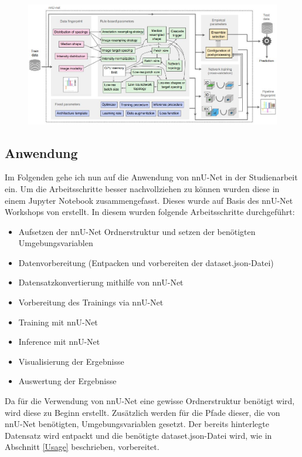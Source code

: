 \begin{figure}[H]
\includegraphics[width=\linewidth]{./images/nnUnetAutomatedMethodConfig.jpg}
\label{fig:nnUNetConfig}
\end{figure}


\subsection{Anwendung}
Im Folgenden gehe ich nun auf die Anwendung von nnU-Net in der Studienarbeit ein. Um die Arbeitsschritte besser nachvollziehen zu können wurden diese in einem Jupyter Notebook zusammengefasst. Dieses wurde auf Basis des nnU-Net Workshops von \cite{Luth.2022} erstellt. In diesem wurden folgende Arbeitsschritte durchgeführt:
\begin{itemize}
\item Aufsetzen der nnU-Net Ordnerstruktur und setzen der benötigten Umgebungsvariablen
\item Datenvorbereitung (Entpacken und vorbereiten der dataset.json-Datei)
\item Datensatzkonvertierung mithilfe von nnU-Net
\item Vorbereitung des Trainings via nnU-Net
\item Training mit nnU-Net
\item Inference mit nnU-Net
\item Visualisierung der Ergebnisse
\item Auswertung der Ergebnisse
\end{itemize}

Da für die Verwendung von nnU-Net eine gewisse Ordnerstruktur benötigt wird, wird diese zu Beginn erstellt. Zusätzlich werden für die Pfade dieser, die von nnU-Net benötigten, Umgebungsvariablen gesetzt. Der bereits hinterlegte Datensatz wird entpackt und die benötigte dataset.json-Datei wird, wie in Abschnitt \ref{Usage} beschrieben, vorbereitet.

